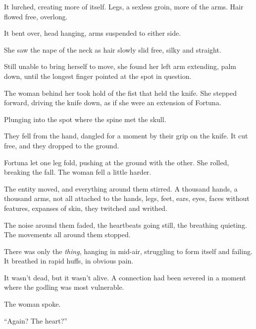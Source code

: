 It lurched, creating more of itself.  Legs, a sexless groin, more of the arms.  Hair flowed free, overlong.



It bent over, head hanging, arms suspended to either side.



She saw the nape of the neck as hair slowly slid free, silky and straight.



Still unable to bring herself to move, she found her left arm extending, palm down, until the longest finger pointed at the spot in question.



The woman behind her took hold of the fist that held the knife.  She stepped forward, driving the knife down, as if she were an extension of Fortuna.



Plunging into the spot where the spine met the skull.



They fell from the hand, dangled for a moment by their grip on the knife.  It cut free, and they dropped to the ground.



Fortuna let one leg fold, pushing at the ground with the other.  She rolled, breaking the fall.  The woman fell a little harder.



The entity moved, and everything around them stirred.  A thousand hands, a thousand arms, not all attached to the hands, legs, feet, ears, eyes, faces without features, expanses of skin, they twitched and writhed.



The noise around them faded, the heartbeats going still, the breathing quieting.  The movements all around them stopped.



There was only the \emph{thing}, hanging in mid-air, struggling to form itself and failing.  It breathed in rapid huffs, in obvious pain.



It wasn't dead, but it wasn't alive.  A connection had been severed in a moment where the godling was most vulnerable.



The woman spoke.



``Again?  The heart?''



